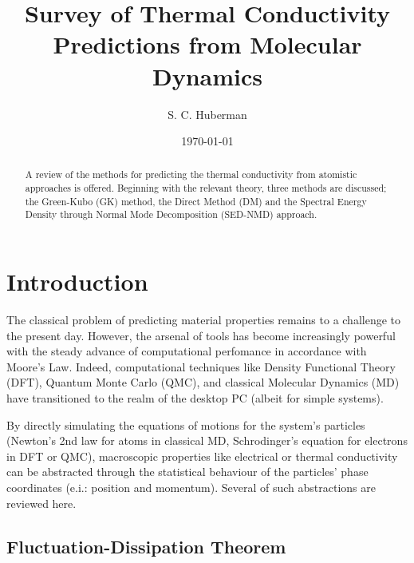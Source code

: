 \documentclass[aps,prb,preprint,preprintnumbers,amsmath,amssymb,floatfix,superscriptaddress]{revtex4}
\begin{document}
\title{Survey of Thermal Conductivity Predictions from Molecular Dynamics}

\author{S. C. Huberman}

\date{\today}%

\vspace{14mm}    
\begin{abstract}
A review of the methods for predicting the thermal conductivity from atomistic approaches is offered. Beginning with the relevant theory, three methods are discussed; the Green-Kubo (GK) method, the Direct Method (DM) and the Spectral Energy Density through Normal Mode Decomposition (SED-NMD) approach.
\end{abstract}
\maketitle

\section*{Introduction}
The classical problem of predicting material properties remains to a challenge to the present day. However, the arsenal of tools has become increasingly powerful with the steady advance of computational perfomance in accordance with Moore's Law. Indeed, computational techniques like Density Functional Theory (DFT), Quantum Monte Carlo (QMC), and classical Molecular Dynamics (MD) have transitioned to the realm of the desktop PC (albeit for simple systems).

By directly simulating the equations of motions for the system's particles (Newton's 2nd law for atoms in classical MD, Schrodinger's equation for electrons in DFT or QMC), macroscopic properties like electrical or thermal conductivity can be abstracted through the statistical behaviour of the particles' phase coordinates (e.i.: position and momentum). Several of such abstractions are reviewed here.    

\subsection*{Fluctuation-Dissipation Theorem}
\end{document}
